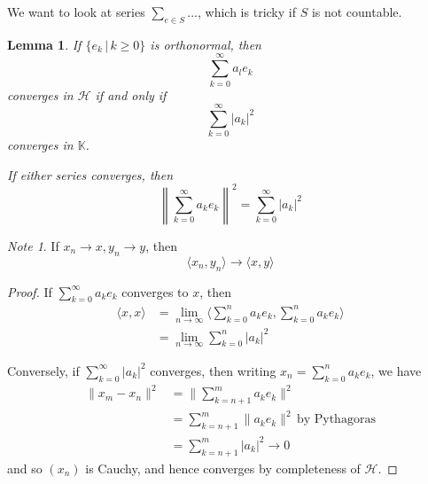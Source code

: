 \documentclass[10pt, oneside, reqno]{amsart}
\theoremstyle{plain}%
\newtheorem{lem}[thm]{Lemma}
\theoremstyle{definition}
\theoremstyle{remark}
\newtheorem*{note}{Note}
\newcommand{\K}{\mathbb{K}}
\newcommand{\Hil}{\mathcal{H}}
\begin{document}
    We want to look at series $\sum_{e \in S} ...$, which is tricky if $S$ is not countable.

\begin{lem}\label{lem:tod}
    If $\{ e_k \, | \, k \geq 0 \}$ is orthonormal, then \[
        \sum_{k=0}^\infty a_l e_k
    \] converges in $\Hil$ if and only if \[
        \sum_{k=0}^\infty |a_k |^2
    \] converges in $\K$.  
    
    If either series converges, then \[
        \left\| \sum_{k=0}^\infty a_k e_k \right\|^2 = \sum_{k=0}^\infty | a_k |^2
    \]
\end{lem}

\begin{note}
    If $x_n \rightarrow x,y_n \rightarrow y$, then \[
        \langle x_n, y_n \rangle \rightarrow \langle x, y \rangle
    \]
\end{note}


\begin{proof}
    If $\sum_{k=0}^\infty a_k e_k$ converges to $x$, then \begin{align*}
        \langle x, x \rangle &= \lim_{n \rightarrow \infty} \langle \sum_{k=0}^n a_k e_k, \sum_{k=0}^n a_k e_k \rangle \\
        &= \lim_{n \rightarrow \infty} \sum_{k=0}^n | a_k |^2
    \end{align*}
    
    Conversely, if $\sum_{k=0}^\infty |a_k |^2$ converges, then writing $x_n = \sum_{k=0}^n a_k e_k$, we have \begin{align*}
        \| x_m - x_n \|^2 &= \| \sum_{k=n+1}^m a_k e_k \|^2 \\
                        &= \sum_{k=n+1}^m \| a_k e_k \|^2 \, \text{by Pythagoras} \\
                        &= \sum_{k=n+1}^m |a_k |^2 \rightarrow 0
    \end{align*} and so $(x_n)$ is Cauchy, and hence converges by completeness of $\Hil$.  
\end{proof}
\end{document}
